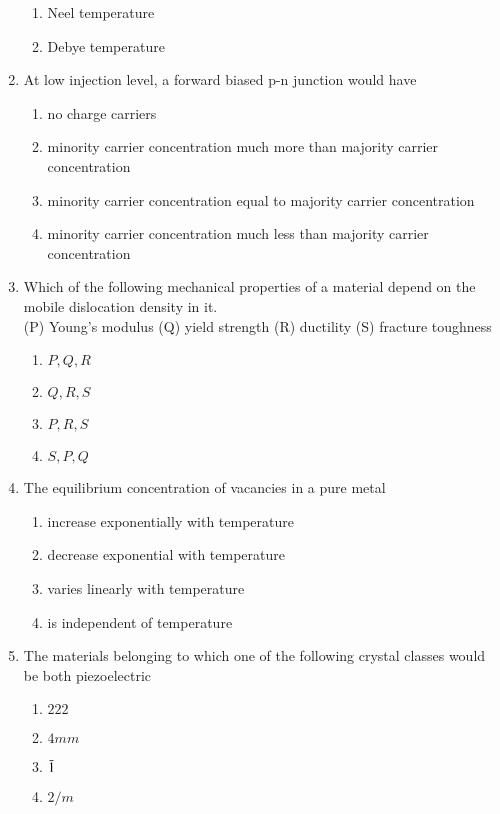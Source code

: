 \documentclass[journal,12pt,onecolumn]{IEEEtran}
\theoremstyle{remark}
\begin{document}
\begin{enumerate}
\begin{enumerate}
    \item Neel temperature
    \item Debye temperature \\
\end{enumerate}
\item At low injection level, a forward biased p-n junction would have 
\begin{enumerate}
    \item no charge carriers
    \item minority carrier concentration much more than majority carrier concentration
    \item minority carrier concentration  equal to majority carrier concentration
    \item minority carrier concentration much less than majority carrier concentration\\
\end{enumerate}
\item Which of the following mechanical properties of a material depend on the mobile dislocation density in it.\\
(P) Young's modulus (Q) yield strength (R) ductility (S) fracture toughness
\begin{enumerate}
    \item $P,Q,R$
    \item $Q,R,S$
    \item $P,R,S$
    \item $S,P,Q$
\end{enumerate}
\item The equilibrium concentration of vacancies in a pure metal 
\begin{enumerate}
    \item increase exponentially with temperature 
    \item decrease exponential with temperature 
    \item varies linearly with temperature 
    \item is independent of temperature 
\end{enumerate}
\item The materials belonging to which one of the following crystal classes would be both piezoelectric
\begin{enumerate}
    \item $222$
    \item $4mm$
    \item $\Bar{1}$
    \item $2/m$
    
\end{enumerate}
\end{enumerate}
\end{document}
